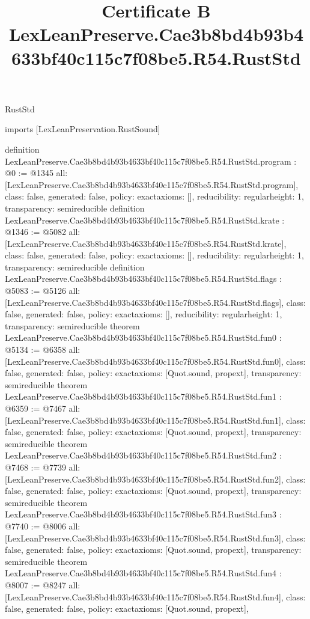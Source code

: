 \begin{lexlean}{RustStd}
\title{Certificate B LexLeanPreserve.Cae3b8bd4b93b4633bf40c115c7f08be5.R54.RustStd}
\begin{coremodule}
imports [LexLeanPreservation.RustSound]

definition LexLeanPreserve.Cae3b8bd4b93b4633bf40c115c7f08be5.R54.RustStd.program : @0 := @1345 {
  all: [LexLeanPreserve.Cae3b8bd4b93b4633bf40c115c7f08be5.R54.RustStd.program],
  class: false,
  generated: false,
  policy: exact{axioms: []},
  reducibility: regular{height: 1},
  transparency: semireducible
}
definition LexLeanPreserve.Cae3b8bd4b93b4633bf40c115c7f08be5.R54.RustStd.krate : @1346 := @5082 {
  all: [LexLeanPreserve.Cae3b8bd4b93b4633bf40c115c7f08be5.R54.RustStd.krate],
  class: false,
  generated: false,
  policy: exact{axioms: []},
  reducibility: regular{height: 1},
  transparency: semireducible
}
definition LexLeanPreserve.Cae3b8bd4b93b4633bf40c115c7f08be5.R54.RustStd.flags : @5083 := @5126 {
  all: [LexLeanPreserve.Cae3b8bd4b93b4633bf40c115c7f08be5.R54.RustStd.flags],
  class: false,
  generated: false,
  policy: exact{axioms: []},
  reducibility: regular{height: 1},
  transparency: semireducible
}
theorem LexLeanPreserve.Cae3b8bd4b93b4633bf40c115c7f08be5.R54.RustStd.fun0 : @5134 := @6358 {
  all: [LexLeanPreserve.Cae3b8bd4b93b4633bf40c115c7f08be5.R54.RustStd.fun0],
  class: false,
  generated: false,
  policy: exact{axioms: [Quot.sound, propext]},
  transparency: semireducible
}
theorem LexLeanPreserve.Cae3b8bd4b93b4633bf40c115c7f08be5.R54.RustStd.fun1 : @6359 := @7467 {
  all: [LexLeanPreserve.Cae3b8bd4b93b4633bf40c115c7f08be5.R54.RustStd.fun1],
  class: false,
  generated: false,
  policy: exact{axioms: [Quot.sound, propext]},
  transparency: semireducible
}
theorem LexLeanPreserve.Cae3b8bd4b93b4633bf40c115c7f08be5.R54.RustStd.fun2 : @7468 := @7739 {
  all: [LexLeanPreserve.Cae3b8bd4b93b4633bf40c115c7f08be5.R54.RustStd.fun2],
  class: false,
  generated: false,
  policy: exact{axioms: [Quot.sound, propext]},
  transparency: semireducible
}
theorem LexLeanPreserve.Cae3b8bd4b93b4633bf40c115c7f08be5.R54.RustStd.fun3 : @7740 := @8006 {
  all: [LexLeanPreserve.Cae3b8bd4b93b4633bf40c115c7f08be5.R54.RustStd.fun3],
  class: false,
  generated: false,
  policy: exact{axioms: [Quot.sound, propext]},
  transparency: semireducible
}
theorem LexLeanPreserve.Cae3b8bd4b93b4633bf40c115c7f08be5.R54.RustStd.fun4 : @8007 := @8247 {
  all: [LexLeanPreserve.Cae3b8bd4b93b4633bf40c115c7f08be5.R54.RustStd.fun4],
  class: false,
  generated: false,
  policy: exact{axioms: [Quot.sound, propext]},
}
\end{coremodule}
\end{lexlean}
